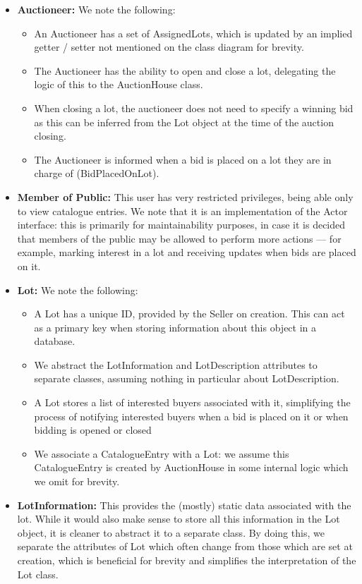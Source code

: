 \documentclass[titlepage, 12pt]{extarticle}
\begin{document}
\begin{itemize}
\begin{itemize}
\begin{enumerate}
    \end{enumerate}
  \end{itemize}
\item {\bf Auctioneer: } We note the following:
  \begin{itemize}
    \item An Auctioneer has a set of AssignedLots, which is updated by an implied getter / setter not mentioned on the class diagram for brevity. 
    \item The Auctioneer has the ability to open and close a lot, delegating the logic of this to the AuctionHouse class. 
    \item When closing a lot, the auctioneer does not need to specify a winning bid as this can be inferred from the Lot object at the time of the auction closing. 
    \item The Auctioneer is informed when a bid is placed on a lot they are in charge of (BidPlacedOnLot). 
  \end{itemize}
\item {\bf Member of Public: } This user has very restricted privileges, being able only to view catalogue entries. We note that it is an implementation of the Actor interface: this is primarily for maintainability purposes, in case it is decided that members of the public may be allowed to perform more actions --- for example, marking interest in a lot and receiving updates when bids are placed on it.
\item {\bf Lot: } We note the following:
  \begin{itemize}
    \item A Lot has a unique ID, provided by the Seller on creation. This can act as a primary key when storing information about this object in a database. 
    \item We abstract the LotInformation and LotDescription attributes to separate classes, assuming nothing in particular about LotDescription.
    \item A Lot stores a list of interested buyers associated with it, simplifying the process of notifying interested buyers when a bid is placed on it or when bidding is opened or closed
    \item We associate a CatalogueEntry with a Lot: we assume this CatalogueEntry is created by AuctionHouse in some internal logic which we omit for brevity.
  \end{itemize}
\item {\bf LotInformation: } This provides the (mostly) static data associated with the lot. While it would also make sense to store all this information in the Lot object, it is cleaner to abstract it to a separate class. By doing this, we separate the attributes of Lot which often change from those which are set at creation, which is beneficial for brevity and simplifies the interpretation of the Lot class. 

\end{itemize}
\end{document}
